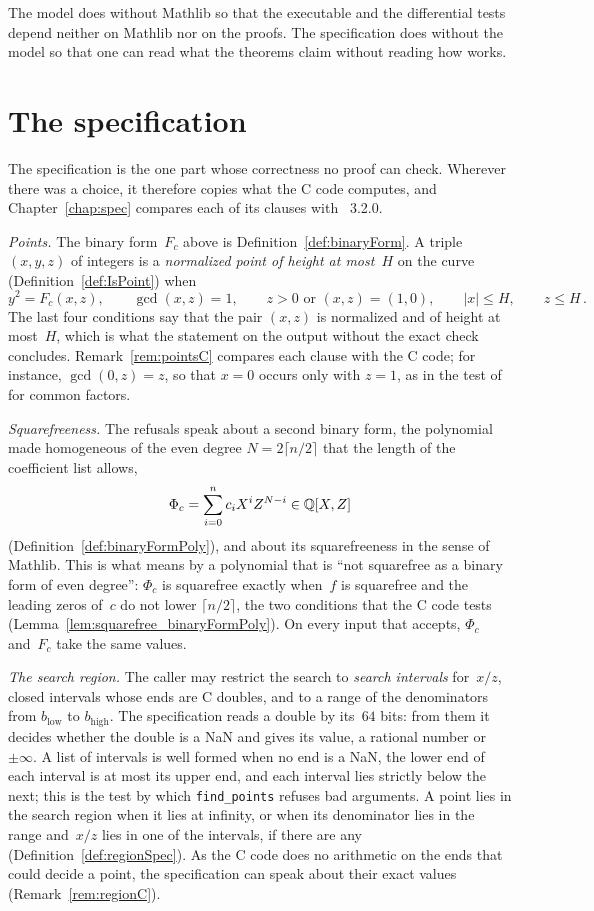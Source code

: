 The model does without Mathlib so that the executable and the differential tests depend neither on
Mathlib nor on the proofs. The specification does without the model so that one can read what the
theorems claim without reading how \ratpoints{} works.

\section{The specification}\label{sec:overviewSpec}

The specification is the one part whose correctness no proof can check. Wherever there was a
choice, it therefore copies what the C code computes, and Chapter~\ref{chap:spec} compares each of
its clauses with \ratpoints{}~3.2.0.

\emph{Points.} The binary form~$F_c$ above is Definition~\ref{def:binaryForm}. A triple
$(x, y, z)$ of integers is a \emph{normalized point of height at most~$H$} on the curve
(Definition~\ref{def:IsPoint}) when
\[ y^2 = F_c(x, z), \qquad \gcd(x, z) = 1, \qquad z > 0 \text{ or } (x, z) = (1, 0), \qquad
   |x| \le H, \qquad z \le H\,. \]
The last four conditions say that the pair $(x, z)$ is normalized and of height at most~$H$, which
is what the statement on the output without the exact check concludes. Remark~\ref{rem:pointsC}
compares each clause with the C code; for instance, $\gcd(0, z) = z$, so that $x = 0$ occurs only
with $z = 1$, as in the test of \ratpoints{} for common factors.

\emph{Squarefreeness.} The refusals speak about a second binary form, the polynomial made
homogeneous of the even degree $N = 2 \lceil n/2 \rceil$ that the length of the coefficient list
allows,
\[ \Phi_c = \sum_{i=0}^{n} c_i X^i Z^{N - i} \in \mathbb{Q}[X, Z] \]
(Definition~\ref{def:binaryFormPoly}), and about its squarefreeness in the sense of Mathlib. This is
what \ratpoints{} means by a polynomial that is ``not squarefree as a binary form of even degree'':
$\Phi_c$ is squarefree exactly when~$f$ is squarefree and the leading zeros of~$c$ do not lower
$\lceil n/2 \rceil$, the two conditions that the C code tests
(Lemma~\ref{lem:squarefree_binaryFormPoly}). On every input that \ratpoints{} accepts, $\Phi_c$
and~$F_c$ take the same values.

\emph{The search region.} The caller may restrict the search to \emph{search intervals} for~$x/z$,
closed intervals whose ends are C doubles, and to a range of the denominators from
$b_{\mathrm{low}}$ to $b_{\mathrm{high}}$. The specification reads a double by its~$64$ bits: from
them it decides whether the double is a NaN and gives its value, a rational number or~$\pm\infty$.
A list of intervals is well formed when no end is a NaN, the lower end of each interval is at most
its upper end, and each interval lies strictly below the next; this is the test by which
\verb|find_points| refuses bad arguments. A point lies in the search region when it lies at
infinity, or when its denominator lies in the range and~$x/z$ lies in one of the intervals, if
there are any (Definition~\ref{def:regionSpec}). As the C code does no arithmetic on the ends that
could decide a point, the specification can speak about their exact values
(Remark~\ref{rem:regionC}).


